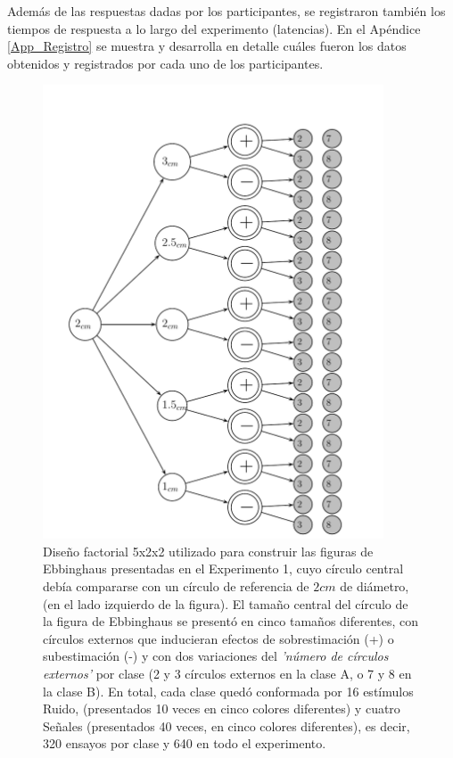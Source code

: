 \begin{itemize}
Además de las respuestas dadas por los participantes, se registraron también los tiempos de respuesta a lo largo del experimento (latencias). En el Apéndice \ref{App_Registro} se muestra y desarrolla en detalle cuáles fueron los datos obtenidos y registrados por cada uno de los participantes.\\

\begin{figure}[th]
\centering
\includegraphics[width=0.9\textwidth]{Figures/Estimulos_Experimento1} 
\decoRule
\caption[Diseño de Estímulos en el Experimento 1]{Diseño factorial 5x2x2 utilizado para construir las figuras de Ebbinghaus presentadas en el Experimento 1, cuyo círculo central debía compararse con un círculo de referencia de $2cm$ de diámetro, (en el lado izquierdo de la figura). El tamaño central del círculo de la figura de Ebbinghaus se presentó en cinco tamaños diferentes, con círculos externos que inducieran efectos de sobrestimación (+) o subestimación (-) y con dos variaciones del \textit{'número de círculos externos'} por clase (2 y 3 círculos externos en la clase A, o 7 y 8 en la clase B). En total, cada clase quedó conformada por 16 estímulos Ruido, (presentados 10 veces en cinco colores diferentes) y cuatro Señales (presentados 40 veces, en cinco colores diferentes), es decir, 320 ensayos por clase y 640 en todo el experimento.}
\label{fig:Exp_1}
\end{figure}


\end{itemize}

